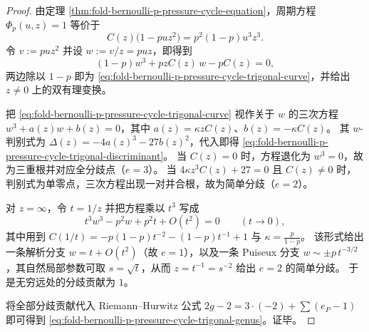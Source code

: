 \begin{proof}
由定理 \ref{thm:fold-bernoulli-p-pressure-cycle-equation}，周期方程 \(\Phi_p(u,z)=1\) 等价于
\[
C(z)\bigl(1-puz^{2}\bigr)=p^{2}(1-p)u^{3}z^{3}.
\]
令 \(v:=puz^{2}\) 并设 \(w:=v/z=puz\)，即得到
\[
(1-p)w^{3}+p z C(z)\,w-p C(z)=0,
\]
两边除以 \(1-p\) 即为 \eqref{eq:fold-bernoulli-p-pressure-cycle-trigonal-curve}，并给出 \(z\neq 0\) 上的双有理变换。
\par
把 \eqref{eq:fold-bernoulli-p-pressure-cycle-trigonal-curve} 视作关于 \(w\) 的三次方程 \(w^{3}+a(z)w+b(z)=0\)，其中
\(
a(z)=\kappa z C(z)
\)、\(
b(z)=-\kappa C(z)
\)。
其 \(w\)-判别式为 \(\Delta(z)=-4a(z)^{3}-27b(z)^{2}\)，代入即得 \eqref{eq:fold-bernoulli-p-pressure-cycle-trigonal-discriminant}。
当 \(C(z)=0\) 时，方程退化为 \(w^{3}=0\)，故为三重根并对应全分歧点（\(e=3\)）。
当 \(4\kappa z^{3}C(z)+27=0\) 且 \(C(z)\neq 0\) 时，判别式为单零点，三次方程出现一对并合根，故为简单分歧（\(e=2\)）。
\par
对 \(z=\infty\)，令 \(t=1/z\) 并把方程乘以 \(t^{3}\) 写成
\[
t^{3}w^{3}-p^{2}w+p^{2}t+O(t^{2})=0\qquad(t\to 0),
\]
其中用到 \(C(1/t)=-p(1-p)t^{-2}-(1-p)t^{-1}+1\) 与 \(\kappa=\frac{p}{1-p}\)。
该形式给出一条解析分支 \(w=t+O(t^{2})\)（故 \(e=1\)），以及一条 Puiseux 分支 \(w\sim \pm p\,t^{-3/2}\)，其自然局部参数可取 \(s=\sqrt t\)，从而 \(z=t^{-1}=s^{-2}\) 给出 \(e=2\) 的简单分歧。
于是无穷远处的分歧贡献为 \(1\)。
\par
将全部分歧贡献代入 Riemann--Hurwitz 公式
\(
2g-2=3\cdot(-2)+\sum(e_P-1)
\)
即可得到 \eqref{eq:fold-bernoulli-p-pressure-cycle-trigonal-genus}。证毕。
\end{proof}

